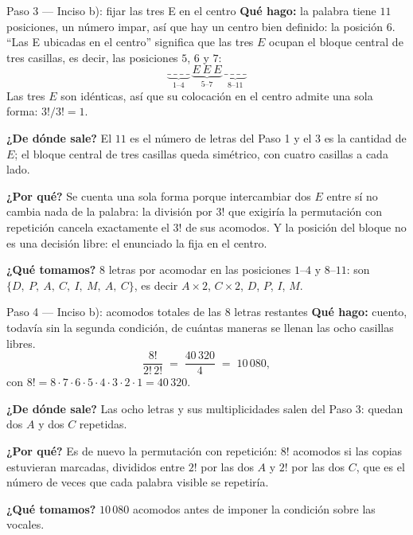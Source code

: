 \documentclass[11pt]{article}
\begin{document}
\begin{paso}{Paso 3 --- Inciso b): fijar las tres E en el centro}
\textbf{Qué hago:} la palabra tiene $11$ posiciones, un número impar, así que hay un centro bien definido: la
posición $6$. ``Las E ubicadas en el centro'' significa que las tres $E$ ocupan el bloque central de tres
casillas, es decir, las posiciones $5$, $6$ y $7$:
\[
\underbrace{\_\ \_\ \_\ \_}_{1\text{--}4}\ \underbrace{E\ E\ E}_{5\text{--}7}\ \underbrace{\_\ \_\ \_\ \_}_{8\text{--}11}
\]
Las tres $E$ son idénticas, así que su colocación en el centro admite una sola forma: $3!/3!=1$.

\textbf{¿De dónde sale?} El $11$ es el número de letras del Paso 1 y el $3$ es la cantidad de $E$; el bloque
central de tres casillas queda simétrico, con cuatro casillas a cada lado.

\textbf{¿Por qué?} Se cuenta una sola forma porque intercambiar dos $E$ entre sí no cambia nada de la
palabra: la división por $3!$ que exigiría la permutación con repetición cancela exactamente el $3!$ de sus
acomodos. Y la posición del bloque no es una decisión libre: el enunciado la fija en el centro.

\textbf{¿Qué tomamos?} $8$ letras por acomodar en las posiciones $1$--$4$ y $8$--$11$: son
$\{D,\ P,\ A,\ C,\ I,\ M,\ A,\ C\}$, es decir $A\times2$, $C\times2$, $D$, $P$, $I$, $M$.
\end{paso}

\begin{paso}{Paso 4 --- Inciso b): acomodos totales de las 8 letras restantes}
\textbf{Qué hago:} cuento, todavía sin la segunda condición, de cuántas maneras se llenan las ocho casillas
libres.
\[
\frac{8!}{2!\,2!} \;=\; \frac{40\,320}{4} \;=\; 10\,080 ,
\]
con $8!=8\cdot7\cdot6\cdot5\cdot4\cdot3\cdot2\cdot1=40\,320$.

\textbf{¿De dónde sale?} Las ocho letras y sus multiplicidades salen del Paso 3: quedan dos $A$ y dos $C$
repetidas.

\textbf{¿Por qué?} Es de nuevo la permutación con repetición: $8!$ acomodos si las copias estuvieran
marcadas, divididos entre $2!$ por las dos $A$ y $2!$ por las dos $C$, que es el número de veces que cada
palabra visible se repetiría.

\textbf{¿Qué tomamos?} $10\,080$ acomodos antes de imponer la condición sobre las vocales.
\end{paso}
\end{document}
